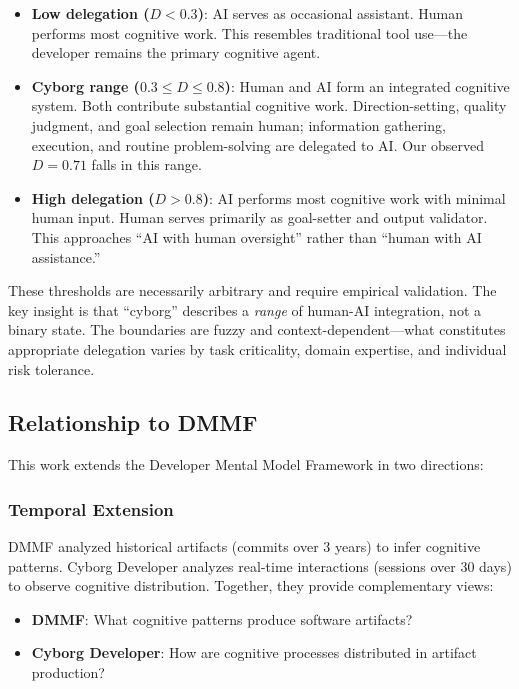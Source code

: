 \begin{itemize}
    \item \textbf{Low delegation ($D < 0.3$)}: AI serves as occasional assistant. Human performs most cognitive work. This resembles traditional tool use---the developer remains the primary cognitive agent.

    \item \textbf{Cyborg range ($0.3 \leq D \leq 0.8$)}: Human and AI form an integrated cognitive system. Both contribute substantial cognitive work. Direction-setting, quality judgment, and goal selection remain human; information gathering, execution, and routine problem-solving are delegated to AI. Our observed $D = 0.71$ falls in this range.

    \item \textbf{High delegation ($D > 0.8$)}: AI performs most cognitive work with minimal human input. Human serves primarily as goal-setter and output validator. This approaches ``AI with human oversight'' rather than ``human with AI assistance.''
\end{itemize}

These thresholds are necessarily arbitrary and require empirical validation. The key insight is that ``cyborg'' describes a {\itshape range} of human-AI integration, not a binary state. The boundaries are fuzzy and context-dependent---what constitutes appropriate delegation varies by task criticality, domain expertise, and individual risk tolerance.

\subsection{Relationship to DMMF}

This work extends the Developer Mental Model Framework \cite{silva2025dmmf} in two directions:

\subsubsection{Temporal Extension}

DMMF analyzed historical artifacts (commits over 3 years) to infer cognitive patterns. Cyborg Developer analyzes real-time interactions (sessions over 30 days) to observe cognitive distribution. Together, they provide complementary views:

\begin{itemize}
    \item \textbf{DMMF}: What cognitive patterns produce software artifacts?
    \item \textbf{Cyborg Developer}: How are cognitive processes distributed in artifact production?
\end{itemize}


